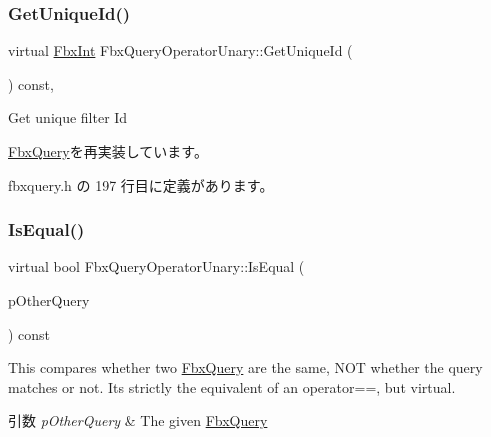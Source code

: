 \mbox{\label{class_fbx_query_operator_unary_ac2e7dbfc697aee51db49db2857ab2b7c}} 
\subsubsection{\texorpdfstring{Get\+Unique\+Id()}{GetUniqueId()}}
{\footnotesize\ttfamily virtual \hyperlink{fbxtypes_8h_a088fa96de3b0b3ea69f0f6afef525dfb}{Fbx\+Int} Fbx\+Query\+Operator\+Unary\+::\+Get\+Unique\+Id (\begin{DoxyParamCaption}{ }\end{DoxyParamCaption}) const\hspace{0.3cm}{\ttfamily [inline]}, {\ttfamily [virtual]}}



Get unique filter Id 



\hyperlink{class_fbx_query_ac7daae8f6fa83cd97ae24e93d7b4dc29}{Fbx\+Query}を再実装しています。



 fbxquery.\+h の 197 行目に定義があります。

\mbox{\label{class_fbx_query_operator_unary_a36c2fea0f42bd732d559375d64b0134e}} 
\subsubsection{\texorpdfstring{Is\+Equal()}{IsEqual()}}
{\footnotesize\ttfamily virtual bool Fbx\+Query\+Operator\+Unary\+::\+Is\+Equal (\begin{DoxyParamCaption}\item[{\hyperlink{class_fbx_query}{Fbx\+Query} $\ast$}]{p\+Other\+Query }\end{DoxyParamCaption}) const\hspace{0.3cm}{\ttfamily [virtual]}}

This compares whether two \hyperlink{class_fbx_query}{Fbx\+Query} are the same, N\+OT whether the query matches or not. It\textquotesingle{}s strictly the equivalent of an operator==, but virtual. 
\begin{DoxyParams}{引数}
{\em p\+Other\+Query} & The given \hyperlink{class_fbx_query}{Fbx\+Query} \\
\hline
\end{DoxyParams}



